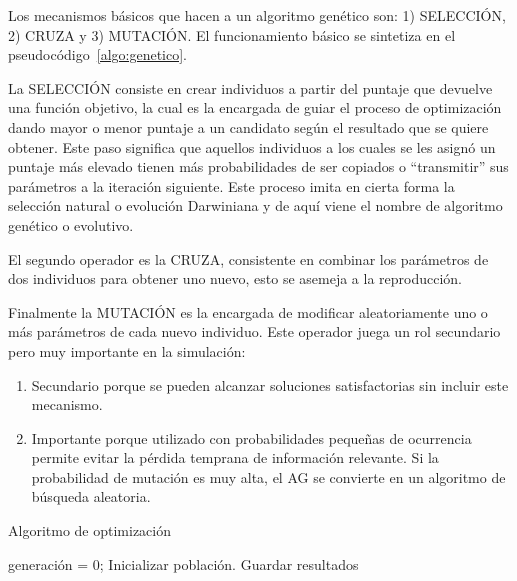 %
Los mecanismos básicos que hacen a un algoritmo genético son: 1) SELECCIÓN, 2) CRUZA y 3) MUTACIÓN.
%
El funcionamiento básico se sintetiza en el pseudocódigo~\ref{algo:genetico}.

La SELECCIÓN consiste en crear individuos a partir del puntaje que devuelve
una función objetivo, la cual es la encargada de guiar el proceso de
optimización dando mayor o menor puntaje a un candidato según el resultado que
se quiere obtener.
%
Este paso significa que aquellos individuos a los cuales se les asignó un
puntaje más elevado tienen más probabilidades de ser copiados o ``transmitir''
sus parámetros a la iteración siguiente.
%
Este proceso imita en cierta forma la selección natural o evolución Darwiniana y
de aquí viene el nombre de algoritmo genético o evolutivo.

El segundo operador es la CRUZA, consistente en combinar los parámetros de dos
individuos para obtener uno nuevo, esto se asemeja a la reproducción.

Finalmente la MUTACIÓN es la encargada de modificar aleatoriamente uno o más
parámetros de cada nuevo individuo.
%
Este operador juega un rol secundario pero muy importante en la simulación:
\begin{enumerate}
  \item Secundario porque se pueden alcanzar soluciones satisfactorias sin incluir este
        mecanismo.
  \item Importante porque utilizado con probabilidades pequeñas de ocurrencia
permite evitar la pérdida temprana de información relevante.
        Si la probabilidad de mutación es muy alta, el AG se convierte en un
algoritmo de búsqueda aleatoria.
\end{enumerate}


\begin{algorithm} \caption{Algoritmo de optimización}\label{algo:genetico}
  generación = 0;
  Inicializar población.\;
  {Guardar resultados\;}
\end{algorithm}

